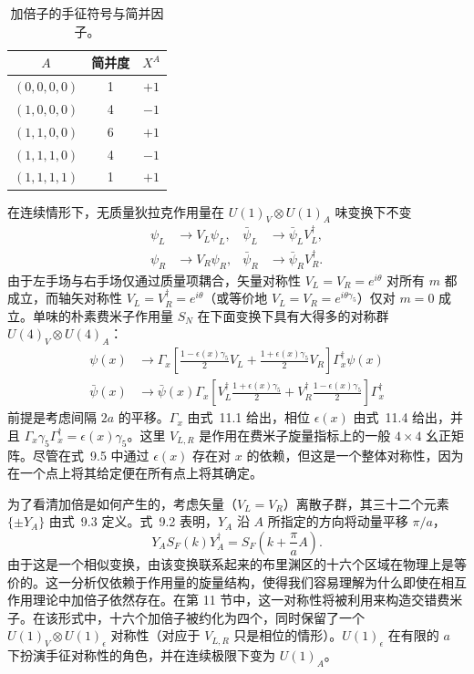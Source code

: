 \begin{table}[htbp]
\centering
\begin{tabular}{ccc}
\toprule
$A$ & 简并度 & $X^A$ \\
\midrule
$(0, 0, 0, 0)$ & 1 & $+1$ \\
$(1, 0, 0, 0)$ & 4 & $-1$ \\
$(1, 1, 0, 0)$ & 6 & $+1$ \\
$(1, 1, 1, 0)$ & 4 & $-1$ \\
$(1, 1, 1, 1)$ & 1 & $+1$ \\
\bottomrule
\end{tabular}
\caption{加倍子的手征符号与简并因子。}
\label{tab:3}
\end{table}

在连续情形下，无质量狄拉克作用量在 $U(1)_V \otimes U(1)_A$ 味变换下不变
\begin{equation}
\begin{aligned}
\psi_L &\to V_L \psi_L , & \bar{\psi}_L &\to \bar{\psi}_L V_L^\dagger , \\
\psi_R &\to V_R \psi_R , & \bar{\psi}_R &\to \bar{\psi}_R V_R^\dagger .
\end{aligned}
\end{equation}
由于左手场与右手场仅通过质量项耦合，矢量对称性 $V_L = V_R = e^{i\theta}$ 对所有 $m$ 都成立，而轴矢对称性 $V_L = V_R^\dagger = e^{i\theta}$（或等价地 $V_L = V_R = e^{i\theta\gamma_5}$）仅对 $m = 0$ 成立。单味的朴素费米子作用量 $S_N$ 在下面变换下具有大得多的对称群 $U(4)_V \otimes U(4)_A$：
\begin{equation}
\begin{aligned}
\psi(x) &\to \Gamma_x \left[ \frac{1 - \epsilon(x)\gamma_5}{2} V_L + \frac{1 + \epsilon(x)\gamma_5}{2} V_R \right] \Gamma_x^\dagger \psi(x) \\
\bar{\psi}(x) &\to \bar{\psi}(x) \Gamma_x \left[ V_L^\dagger \frac{1 + \epsilon(x)\gamma_5}{2} + V_R^\dagger \frac{1 - \epsilon(x)\gamma_5}{2} \right] \Gamma_x^\dagger
\end{aligned}
\end{equation}
前提是考虑间隔 $2a$ 的平移。$\Gamma_x$ 由式~11.1 给出，相位 $\epsilon(x)$ 由式~11.4 给出，并且 $\Gamma_x \gamma_5 \Gamma_x^\dagger = \epsilon(x)\gamma_5$。这里 $V_{L,R}$ 是作用在费米子旋量指标上的一般 $4 \times 4$ 幺正矩阵。尽管在式~9.5 中通过 $\epsilon(x)$ 存在对 $x$ 的依赖，但这是一个整体对称性，因为在一个点上将其给定便在所有点上将其确定。

为了看清加倍是如何产生的，考虑矢量（$V_L = V_R$）离散子群，其三十二个元素 $\{\pm Y_A\}$ 由式~9.3 定义。式~9.2 表明，$Y_A$ 沿 $A$ 所指定的方向将动量平移 $\pi/a$，
\begin{equation}
Y_A S_F(k) Y_A^\dagger = S_F\!\left( k + \frac{\pi}{a} A \right) .
\end{equation}
由于这是一个相似变换，由该变换联系起来的布里渊区的十六个区域在物理上是等价的。这一分析仅依赖于作用量的旋量结构，使得我们容易理解为什么即使在相互作用理论中加倍子依然存在。在第 11 节中，这一对称性将被利用来构造交错费米子。在该形式中，十六个加倍子被约化为四个，同时保留了一个 $U(1)_V \otimes U(1)_\epsilon$ 对称性（对应于 $V_{L,R}$ 只是相位的情形）。$U(1)_\epsilon$ 在有限的 $a$ 下扮演手征对称性的角色，并在连续极限下变为 $U(1)_A$。

